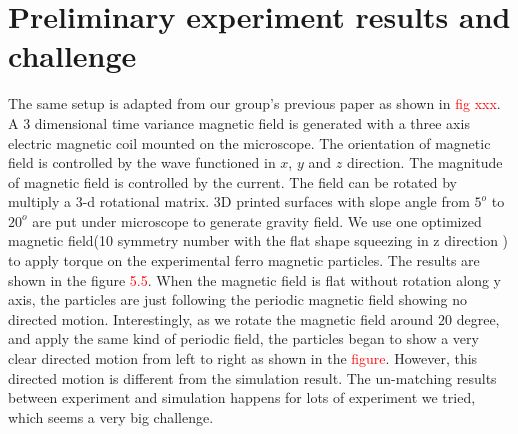  \section{Preliminary experiment results and challenge}
 The same setup is adapted from our group's previous paper as shown in \textcolor{red}{fig xxx}. \cite{fei2018magneto, fei2019magneto} A 3 dimensional time variance magnetic field is generated with a three axis electric magnetic coil mounted on the microscope. The orientation of magnetic field is controlled by the wave functioned in $x$, $y$ and $z$ direction. The magnitude of magnetic field is controlled by the current. The field can be rotated by multiply a 3-d rotational matrix. 3D printed  surfaces with slope angle from $5^o$ to  $20^o$ are put under microscope to generate gravity field. We use one optimized magnetic field(10 symmetry number with the flat shape  squeezing in z direction ) to apply torque on the experimental ferro magnetic particles. The results are shown in the figure \textcolor{red}{5.5}. When the magnetic field is flat without rotation along y axis, the particles are just following the periodic magnetic field showing no directed motion. Interestingly, as we rotate the magnetic field around $20$ degree, and apply the same kind of periodic field, the particles began to show a very clear directed motion from left to right as shown in the \textcolor{red}{figure}. However, this directed motion is different from the simulation result. The un-matching results between  experiment and simulation happens for lots of experiment we tried, which seems a very big challenge. 
 
